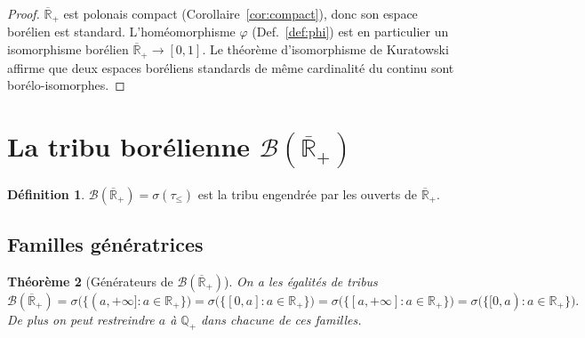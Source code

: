 \documentclass[11pt,a4paper]{article}
\theoremstyle{plain}
\newtheorem{theorem}{Théorème}[section]
\theoremstyle{definition}
\newtheorem{definition}[theorem]{Définition}
\newcommand{\Q}{\mathbb{Q}}
\newcommand{\Rp}{\mathbb{R}_+}
\newcommand{\Rpb}{\overline{\mathbb{R}}_+}
\newcommand{\B}{\mathcal{B}}
\newcommand{\sig}{\sigma}
\begin{document}
\begin{proof}
$\Rpb$ est polonais compact (Corollaire~\ref{cor:compact}), donc son espace
borélien est standard. L'homéomorphisme $\varphi$ (Def.~\ref{def:phi}) est en
particulier un isomorphisme borélien $\Rpb\to[0,1]$. Le théorème d'isomorphisme
de Kuratowski affirme que deux espaces boréliens standards de même cardinalité
du continu sont borélo-isomorphes.
\end{proof}

\section{La tribu borélienne $\B(\Rpb)$}

\begin{definition}
$\B(\Rpb)=\sig(\tau_\le)$ est la tribu engendrée par les ouverts de $\Rpb$.
\end{definition}

\subsection{Familles génératrices}

\begin{theorem}[Générateurs de $\B(\Rpb)$]\label{thm:generateurs}
On a les égalités de tribus
\[
\B(\Rpb)
=\sig\big(\{(a,+\infty]: a\in\Rp\}\big)
=\sig\big(\{[0,a]: a\in\Rp\}\big)
=\sig\big(\{[a,+\infty]: a\in\Rp\}\big)
=\sig\big(\{[0,a): a\in\Rp\}\big).
\]
De plus on peut restreindre $a$ à $\Q_+$ dans chacune de ces familles.
\end{theorem}
\end{document}
